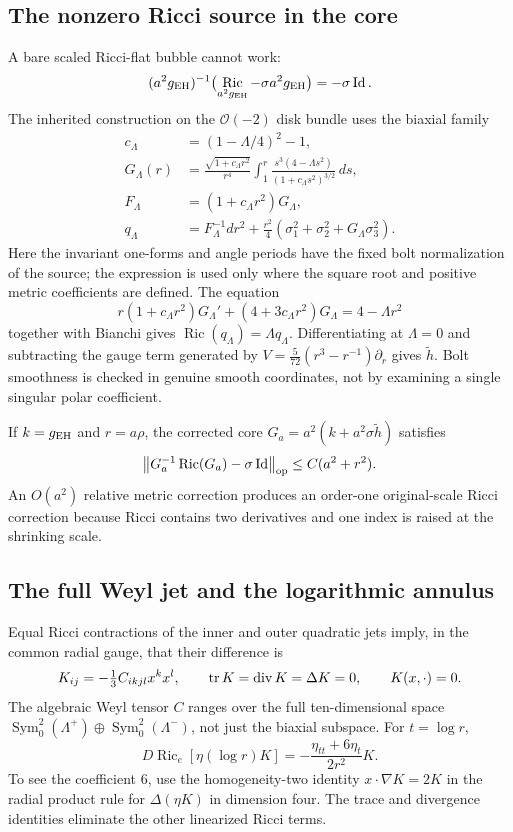 \documentclass[a4paper,11pt]{article}
\theoremstyle{definition}
\DeclareMathOperator{\Ric}{Ric}\DeclareMathOperator{\Rm}{Rm}
\DeclareMathOperator{\Id}{Id}\DeclareMathOperator{\Div}{div}
\DeclareMathOperator{\Sym}{Sym}\DeclareMathOperator{\Out}{Out}
\newcommand{\norm}[1]{\left\lVert#1\right\rVert}
\begin{document}
\subsection{The nonzero Ricci source in the core}\label{sec:A1-core}
A bare scaled Ricci-flat bubble cannot work:
\[
 (a^2g_{\rm EH})^{-1}
   \bigl(\Ric_{a^2g_{\rm EH}}-\sigma a^2g_{\rm EH}\bigr)
       =-\sigma\Id .
\]
The inherited construction on the $\mathcal O(-2)$ disk bundle uses
the biaxial family
\begin{align}
c_\Lambda&=(1-\Lambda/4)^2-1,\\
G_\Lambda(r)&=\frac{\sqrt{1+c_\Lambda r^2}}{r^4}
 \int_1^r\frac{s^3(4-\Lambda s^2)}
 {(1+c_\Lambda s^2)^{3/2}}\,ds,\\
F_\Lambda&=(1+c_\Lambda r^2)G_\Lambda,\\
q_\Lambda&=F_\Lambda^{-1}dr^2+
 \frac{r^2}{4}(\sigma_1^2+\sigma_2^2+G_\Lambda\sigma_3^2).
\end{align}
Here the invariant one-forms and angle periods have the fixed bolt
normalization of the source; the expression is used only where the
square root and positive metric coefficients are defined. The equation
\[
r(1+c_\Lambda r^2)G_\Lambda'
 +(4+3c_\Lambda r^2)G_\Lambda=4-\Lambda r^2
\]
together with Bianchi gives $\Ric(q_\Lambda)=\Lambda q_\Lambda$.
Differentiating at $\Lambda=0$ and subtracting the gauge term generated
by $V=\frac5{72}(r^3-r^{-1})\partial_r$ gives $\widetilde h$.
Bolt smoothness is checked in genuine smooth coordinates, not by
examining a single singular polar coefficient.

If $k=g_{\rm EH}$ and $r=a\rho$, the corrected core
$G_a=a^2(k+a^2\sigma\widetilde h)$ satisfies
\begin{equation}\label{eq:core-error}
 \norm{G_a^{-1}\Ric(G_a)-\sigma\Id}_{\op}
                   \le C(a^2+r^2).
\end{equation}
An $O(a^2)$ relative metric correction produces an order-one original-scale
Ricci correction because Ricci contains two derivatives and one index is
raised at the shrinking scale.

\subsection{The full Weyl jet and the logarithmic annulus}\label{sec:A1-log}
Equal Ricci contractions of the inner and outer quadratic jets imply,
in the common radial gauge, that their difference is
\[
 K_{ij}=-\tfrac13C_{ikjl}x^kx^l,\qquad
 \tr K=\Div K=\Delta K=0,\qquad K(x,\cdot)=0 .
\]
The algebraic Weyl tensor $C$ ranges over the full ten-dimensional
space $\Sym^2_0(\Lambda^+)\oplus\Sym^2_0(\Lambda^-)$, not just
the biaxial subspace. For $t=\log r$,
\begin{equation}\label{eq:log-Weyl}
 D\Ric_e[\eta(\log r)K]
             =-\frac{\eta_{tt}+6\eta_t}{2r^2}K.
\end{equation}
To see the coefficient $6$, use the homogeneity-two identity
$x\cdot\nabla K=2K$ in the radial product rule for $\Delta(\eta K)$
in dimension four. The trace and divergence identities eliminate the
other linearized Ricci terms.
\end{document}

